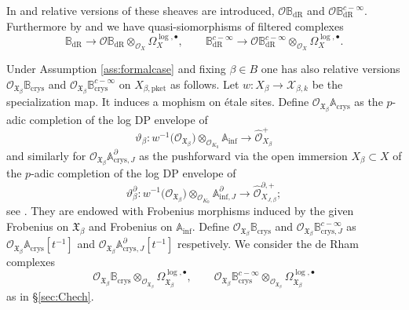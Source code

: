 \documentclass[asterisque,english]{smfart}
\begin{document}
In  \cite{DLLZb} and \cite{LLZ} relative versions of these sheaves are introduced, $\mathcal{O}\mathbb{B}_{\mathrm{dR}}$ and $\mathcal{O}\mathbb{B}_{\mathrm{dR}}^{c-\infty}$. Furthermore by \cite[Cor. 2.4.2]{DLLZb} and  \cite[Cor. 2.5.13]{LLZ} we have quasi-siomorphisms of filtered complexes $$ \mathbb{B}_{\mathrm{dR}} \longrightarrow\mathcal{O}\mathbb{B}_{\mathrm{dR}}\otimes_{\mathcal{O}_X} \Omega^{\log,\bullet}_X,\qquad \mathbb{B}_{\mathrm{dR}}^{c-\infty} \longrightarrow\mathcal{O}\mathbb{B}_{\mathrm{dR}}^{c-\infty}\otimes_{\mathcal{O}_X} \Omega^{\log,\bullet}_X.$$


Under Assumption \ref{ass:formalcase} and fixing $\beta\in B$ one has also relative versions ${\mathcal{O}}_{\mathfrak{X}_\beta}\mathbb{B}_{\mathrm{crys}}$ and ${\mathcal{O}}_{\mathfrak{X}_\beta}\mathbb{B}_{\mathrm{crys}}^{c-\infty}$ on $X_{\beta,\mathrm{pket}}$ as follows. Let $w\colon X_\beta \to \mathcal{X}_{\beta,k}$ be the specialization map. It induces a mophism on \'etale sites.  Define ${\mathcal{O}}_{\mathfrak{X}_\beta}\mathbb{A}_{\mathrm{crys}}$ as the $p$-adic completion of the log DP envelope of $$\vartheta_\beta\colon w^{-1}\bigl(\mathcal{O}_{\mathfrak{X}_\beta}\bigr)\otimes_{\mathcal{O}_{K_0}} \mathbb{A}_{\mathrm{inf}} \to \widehat{\mathcal{O}}_{X_\beta}^+$$and similarly for ${\mathcal{O}}_{\mathfrak{X}_\beta}\mathbb{A}_{\mathrm{crys},J}^\partial $ as the pushforward via the open immersion $X_\beta\subset X$ of the $p$-adic completion of the log DP envelope of $$\vartheta_\beta^\partial \colon w^{-1}\bigl(\mathcal{O}_{\mathfrak{X}_\beta}\bigr)\otimes_{\mathcal{O}_{K_0}} \mathbb{A}_{\mathrm{inf},J}^\partial \to \widehat{\mathcal{O}}_{X_{J,\beta}}^{\partial,+};$$see \cite[Lemma 2.16]{AI}. They are endowed with Frobenius morphisms induced by the given  Frobenius on $\mathfrak{X}_\beta$ and Frobenius on $ \mathbb{A}_{\mathrm{inf}}$. Define ${\mathcal{O}}_{\mathfrak{X}_\beta}\mathbb{B}_{\mathrm{crys}}$ and ${\mathcal{O}}_{\mathfrak{X}_\beta}\mathbb{B}_{\mathrm{crys},J}^{c-\infty}$ as ${\mathcal{O}}_{\mathfrak{X}_\beta}\mathbb{A}_{\mathrm{crys}}[t^{-1}]$ and 
${\mathcal{O}}_{\mathfrak{X}_\beta}\mathbb{A}_{\mathrm{crys},J}^\partial [t^{-1}]$ respetively. We consider the de Rham complexes $${\mathcal{O}}_{\mathfrak{X}_\beta}\mathbb{B}_{\mathrm{crys}}\otimes_{\mathcal{O}_{\mathfrak{X}_\beta}} \Omega_{\mathfrak{X}_\beta}^{\log,\bullet},\qquad{\mathcal{O}}_{\mathfrak{X}_\beta}\mathbb{B}_{\mathrm{crys}}^{c-\infty}\otimes_{\mathcal{O}_{\mathfrak{X}_\beta}} \Omega_{\mathfrak{X}_\beta}^{\log,\bullet}$$
as in \S\ref{sec:Chech}.
\end{document}
